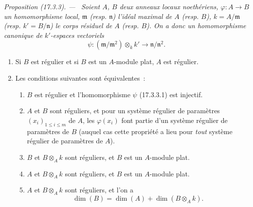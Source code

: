 \documentclass[10pt,oneside]{book}
\makeatletter
\newcommand{\setmanualcurrentlabel}[1]{\def\@currentlabel{#1}}
\newenvironment{proposition}[1][]{%
  \setmanualcurrentlabel{#1}\par\medskip\noindent\itshape Proposition (#1). ---\ }{\par}
\makeatother
\begin{document}
\begin{proposition}[17.3.3]
\label{0.17.3.3-fr}
Soient $A$, $B$ deux anneaux locaux noethériens,
$\varphi:A\longrightarrow B$ un homomorphisme local, $\mathfrak{m}$ (resp.
$\mathfrak{n}$) l'idéal maximal de $A$ (resp. $B$),
$k=A/\mathfrak{m}$ (resp. $k'=B/\mathfrak{n}$) le corps résiduel de $A$
(resp. $B$). On a donc un homomorphisme canonique de $k'$-espaces vectoriels
\begin{equation}
\label{0.17.3.3.1-fr}
\tag{17.3.3.1}
  \psi:(\mathfrak{m}/\mathfrak{m}^2)\otimes_k k'
  \longrightarrow\mathfrak{n}/\mathfrak{n}^2.
\end{equation}
\begin{enumerate}
  \item[\rm (i)] Si $B$ est régulier et si $B$ est un $A$-module plat, $A$
  est régulier.
  \item[\rm (ii)] Les conditions suivantes sont équivalentes~:
  \begin{enumerate}
    \item[\rm a)] $B$ est régulier et l'homomorphisme $\psi$ (17.3.3.1) est
    injectif.
    \item[\rm b)] $A$ et $B$ sont réguliers, et pour un système régulier de
    paramètres $(x_i)_{1\leq i\leq m}$ de $A$, les $\varphi(x_i)$ font partie
    d'un système régulier de paramètres de $B$ (auquel cas cette propriété a
    lieu pour \emph{tout} système régulier de paramètres de $A$).
    \item[\rm c)] $B$ et $B\otimes_A k$ sont réguliers, et $B$ est un
    $A$-module plat.
    \item[\rm d)] $A$ et $B\otimes_A k$ sont réguliers, et $B$ est un
    $A$-module plat.
    \item[\rm e)] $A$ et $B\otimes_A k$ sont réguliers, et l'on a
    \begin{equation}
    \label{0.17.3.3.2-fr}
    \tag{17.3.3.2}
      \dim(B)=\dim(A)+\dim(B\otimes_A k).
    \end{equation}
  \end{enumerate}
\end{enumerate}
\end{proposition}
\end{document}
